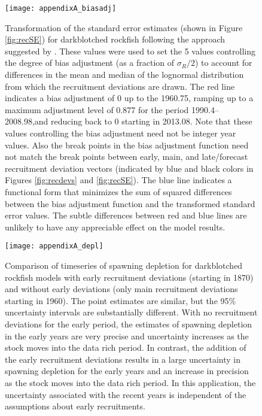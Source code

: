 \begin{figure}[H]
	\begin{center}
	\texttt{[image: appendixA\_biasadj]}\\
	\end{center}
	\caption{ Transformation of the standard error estimates (shown in Figure \ref{fig:recSE}) for darkblotched rockfish following the approach suggested by \citet{methot_adjusting_2011}. These values were used to set the 5 values controlling the degree of bias adjustment (as a fraction of  $\sigma_R/2$) to account for differences in the mean and median of the lognormal distribution from which the recruitment deviations are drawn. The red line indicates a bias adjustment of 0 up to the  1960.75, ramping up to a maximum adjustment level of 0.877 for the period 1990.4–2008.98,and reducing back to 0 starting in 2013.08. Note that these values controlling the bias adjustment need not be integer year values. Also the break points in the bias adjustment function need not match the break points between early, main, and late/forecast recruitment deviation vectors (indicated by blue and black colors in Figures \ref{fig:recdevs} and \ref{fig:recSE}). The blue line indicates a functional form that minimizes the sum of squared differences between the bias adjustment function and the transformed standard error values. The subtle differences between red and blue lines are unlikely to have any appreciable effect on the model results.}
	\label{fig:ramp}
\end{figure}


\begin{figure}[H]
	\begin{center}
	\texttt{[image: appendixA\_depl]}\\
	\end{center}
	\caption{ Comparison of timeseries of spawning depletion for darkblotched rockfish models with early recruitment deviations (starting in 1870) and without early deviations (only main recruitment deviations starting in 1960). The point estimates are similar, but the 95\% uncertainty intervals are substantially different. With no recruitment deviations for the early period, the estimates of spawning depletion in the early years are very precise and uncertainty increases as the stock moves into the data rich period. In contrast, the addition of the early recruitment deviations results in a large uncertainty in spawning depletion for the early years and an increase in precision as the stock moves into the data rich period. In this application, the uncertainty associated with the recent years is independent of the assumptions about early recruitments.}
\end{figure}

